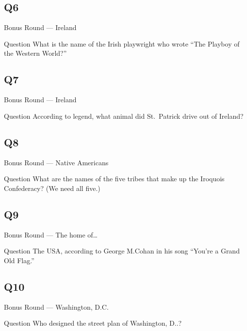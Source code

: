 \documentclass[11pt]{beamer}
\begin{document}
\subsection*{Q6}
\begin{frame}[t]{Bonus Round --- Ireland}
    \vspace{-0.5em}
    \begin{block}{Question}
        What is the name of the Irish playwright who wrote ``The Playboy of the Western World?''
    \end{block}
\end{frame}
\subsection*{Q7}
\begin{frame}[t]{Bonus Round --- Ireland}
    \vspace{-0.5em}
    \begin{block}{Question}
        According to legend, what animal did St.\ Patrick drive out of Ireland?
    \end{block}
\end{frame}
\subsection*{Q8}
\begin{frame}[t]{Bonus Round --- Native Americans}
    \vspace{-0.5em}
    \begin{block}{Question}
        What are the names of the five tribes that make up the Iroquois Confederacy?  (We need all five.)
    \end{block}
\end{frame}
\subsection*{Q9}
\begin{frame}[t]{Bonus Round --- The home of\ldots{}}
    \vspace{-0.5em}
    \begin{block}{Question}
        The USA, according to George M.\@ Cohan in his song ``You're a Grand Old Flag.''
    \end{block}
\end{frame}
\subsection*{Q10}
\begin{frame}[t]{Bonus Round --- Washington, D.C.}
    \vspace{-0.5em}
    \begin{block}{Question}
        Who designed the street plan of Washington, D.\@C.\@?
    \end{block}
\end{frame}
\end{document}
